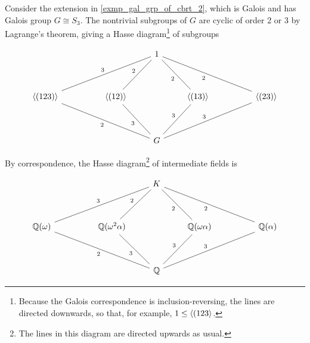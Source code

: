 \begin{example}
\label{exmp_full_gal_corresp_for_cbrt_2}
    Consider the extension in \cref{exmp_gal_grp_of_cbrt_2}, which is Galois and has Galois group $G \cong S_3$. The nontrivial subgroups of $G$ are cyclic of order 2 or 3 by Lagrange's theorem, giving a Hasse diagram\footnote{Because the Galois correspondence is inclusion-reversing, the lines are directed downwards, so that, for example, $1 \leq \langle {(123} \rangle$.} of subgroups
    \begin{figure}[h]
    \captionsetup{justification=centering}
        \[
            \begin{tikzcd}
            	&&& 1 \\
            	\\
            	{\langle (123) \rangle} && {\langle (12) \rangle} && {\langle (13) \rangle} && {\langle (23) \rangle} \\
            	\\
            	&&& G
            	\arrow["3", no head, from=3-1, to=1-4]
            	\arrow["2", no head, from=3-3, to=1-4]
            	\arrow["2", no head, from=3-5, to=1-4]
            	\arrow["2", no head, from=3-7, to=1-4]
            	\arrow["2", no head, from=5-4, to=3-1]
            	\arrow["3", no head, from=5-4, to=3-3]
            	\arrow["3", no head, from=5-4, to=3-5]
            	\arrow["3", no head, from=5-4, to=3-7]
            \end{tikzcd}
        \]
    \end{figure}
    
    \newpage

    By correspondence, the Hasse diagram\footnote{The lines in this diagram are directed upwards as usual.} of intermediate fields is
    \begin{figure}[h]
        \[
            \begin{tikzcd}
            	&&& K \\
            	\\
            	{\bb{Q}(\omega)} && {\bb{Q}(\omega^2 \alpha)} && {\bb{Q}(\omega \alpha)} && {\bb{Q}(\alpha)} \\
            	\\
            	&&& \bb{Q}
            	\arrow["3", no head, from=3-1, to=1-4]
            	\arrow["2", no head, from=3-3, to=1-4]
            	\arrow["2", no head, from=3-5, to=1-4]
            	\arrow["2", no head, from=3-7, to=1-4]
            	\arrow["2", no head, from=5-4, to=3-1]
            	\arrow["3", no head, from=5-4, to=3-3]
            	\arrow["3", no head, from=5-4, to=3-5]
            	\arrow["3", no head, from=5-4, to=3-7]
            \end{tikzcd}
        \]
    \end{figure}
    

\end{example}
